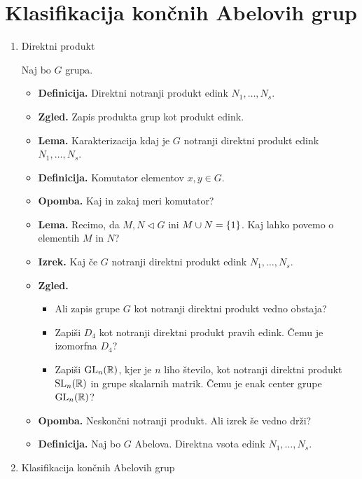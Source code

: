\section{Klasifikacija končnih Abelovih grup}
\begin{enumerate}
    \item Direktni produkt

    Naj bo \(G\) grupa.
    \begin{itemize}
        \item \textbf{Definicija.} Direktni notranji produkt edink \(N_1, \ldots, N_s\).
        \item \textbf{Zgled.} Zapis produkta grup kot produkt edink.
        \item \textbf{Lema.} Karakterizacija kdaj je \(G\) notranji direktni produkt edink \(N_1, \ldots, N_s\).
        \item \textbf{Definicija.} Komutator elementov \(x, y \in G\).
        \item \textbf{Opomba.} Kaj in zakaj meri komutator?
        \item \textbf{Lema.} Recimo, da \(M, N \triangleleft G\) ini \(M \cup N = \{1\}\). Kaj lahko povemo o elementih \(M\) in \(N\)?
        \item \textbf{Izrek.} Kaj če \(G\) notranji direktni produkt edink \(N_1, \ldots, N_s\). \todo{*}
        \item \textbf{Zgled.} \
        \begin{itemize}
            \item Ali zapis grupe \(G\) kot notranji direktni produkt vedno obstaja?
            \item Zapiši \(D_4\) kot notranji direktni produkt pravih edink. Čemu je izomorfna \(D_4\)?
            \item Zapiši \(\operatorname{GL}_n(\mathbb{R})\), kjer je \(n\) liho število, kot notranji direktni produkt \(\operatorname{SL}_n(\mathbb{R})\) in grupe skalarnih matrik. Čemu je enak center grupe \(\operatorname{GL}_n(\mathbb{R})\)?
        \end{itemize}
        \item \textbf{Opomba.} Neskončni notranji produkt. Ali izrek še vedno drži?
        \item \textbf{Definicija.} Naj bo \(G\) Abelova. Direktna vsota edink \(N_1, \ldots, N_s\).
    \end{itemize}

    \item Klasifikacija končnih Abelovih grup
    

\end{enumerate}
